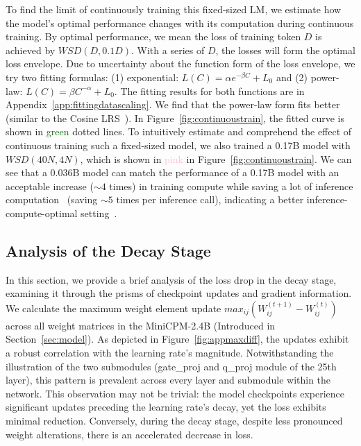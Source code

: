 \documentclass[dvipsnames]{article}
\begin{document}
To find the limit of continuously training this fixed-sized LM, we estimate how the model's optimal performance changes with its computation during continuous training. By optimal performance, we mean the loss of training token $D$ is achieved by ${WSD}(D, 0.1D)$. With a series of $D$, the losses will form the optimal loss envelope. Due to uncertainty about the function form of the loss envelope, we try two fitting formulas: (1) exponential: $L(C) = \alpha e^{-\beta C} + L_0$ and (2) power-law: $L(C) = \beta C^{-\alpha} + L_0$. The fitting results for both functions are in Appendix~\ref{app:fittingdatascaling}. We find that the power-law form fits better (similar to the Cosine LRS~\citep{kaplan2020scaling}). In Figure~\ref{fig:continuoustrain}, the fitted curve is shown in \textcolor{darkgreen}{green} dotted lines. To intuitively estimate and comprehend the effect of continuous training such a fixed-sized model, we also trained a 0.17B model with $WSD(40N, 4N)$, which is shown in \textcolor{pink}{pink} in Figure~\ref{fig:continuoustrain}.  We can see that a 0.036B model can match the performance of a 0.17B model with an acceptable increase ($\sim 4$ times) in training compute while saving a lot of inference computation~\citep{sardana2023beyond} (saving $\sim 5$ times per inference call), indicating a better inference-compute-optimal setting~\citep{sardana2023beyond}.

\subsection{Analysis of the Decay Stage}
In this section, we provide a brief analysis of the loss drop in the decay stage, examining it through the prisms of checkpoint updates and gradient information.  We calculate the maximum weight element update $max_{ij} (W_{ij}^{(t+1)} - W_{ij}^{(t)})$ across all weight matrices in the MiniCPM-2.4B (Introduced in Section~\ref{sec:model}). As depicted in Figure~\ref{fig:appmaxdiff}, the updates exhibit a robust correlation with the learning rate's magnitude. Notwithstanding the illustration of the two submodules (gate\_proj and q\_proj module of the 25th layer), this pattern is prevalent across every layer and submodule within the network. This observation may not be trivial: the model checkpoints experience significant updates preceding the learning rate's decay, yet the loss exhibits minimal reduction. Conversely, during the decay stage, despite less pronounced weight alterations, there is an accelerated decrease in loss.  
\end{document}
